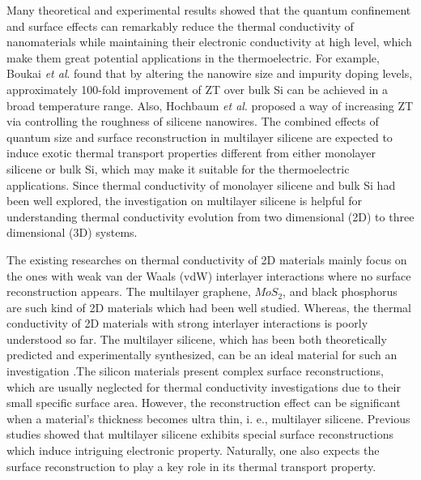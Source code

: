 \documentclass[review]{elsarticle}
\begin{document}
Many theoretical and experimental results showed that the quantum confinement and surface effects can remarkably reduce the thermal conductivity of nanomaterials while maintaining their electronic conductivity at high level, which make them great potential applications in the thermoelectric\cite{Dresselhaus2007,Chen2013}. For example,  Boukai \emph{et al}.\cite{Boukai2008} found that by altering the nanowire size and impurity doping levels,  approximately 100-fold improvement of  ZT over bulk Si can be achieved in a broad temperature range. Also, Hochbaum \emph{et al}.\cite{Hochbaum2008}  proposed a way of increasing ZT via controlling the roughness of silicene nanowires.
The combined effects of quantum size and surface reconstruction in multilayer silicene are expected to induce exotic thermal transport properties different from either monolayer silicene or bulk Si, which may make it suitable for the thermoelectric applications. Since thermal conductivity of monolayer silicene and bulk Si had been well explored, the investigation on multilayer silicene is helpful for understanding thermal conductivity evolution from two dimensional (2D) to three dimensional (3D) systems.

The existing researches on thermal conductivity of 2D materials mainly focus on the ones with weak van der Waals (vdW) interlayer interactions where no surface reconstruction appears. The multilayer graphene\cite{Lindsay2011, Ni2012,Wang2011}, $MoS_2$\cite{Liu2015}, and black phosphorus\cite{Zhang2015,Peng2015,Jain2015} are such kind of 2D materials which had been well studied.  Whereas, the thermal conductivity of 2D materials with strong interlayer interactions is poorly understood so far.
The multilayer silicene, which has been both theoretically predicted and experimentally synthesized, can be an ideal material for such an investigation \cite{Fu2014,Padova2016,Guo2015Structural}.The silicon materials present complex surface reconstructions, which are usually neglected for thermal conductivity investigations due to their small specific surface area. However, the reconstruction effect can be significant when a material's thickness becomes ultra thin, i. e., multilayer silicene.  Previous studies showed that multilayer silicene exhibits special surface reconstructions which induce  intriguing electronic property\cite{Fu2014,Guo2015Structural}. Naturally, one also expects the surface reconstruction to play a key role in its thermal transport property.
\end{document}
